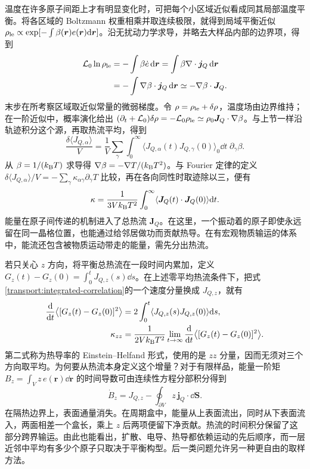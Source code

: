 温度在许多原子间距上才有明显变化时，可把每个小区域近似看成同其局部温度平衡。将各区域的 Boltzmann 权重相乘并取连续极限，就得到局域平衡近似 $\rho_{\rm le}\propto\exp[-\int\beta(\bm r)e(\bm r)\mathrm{d}\bm r]$。沿无扰动力学求导，并略去大样品内部的边界项，得到
\begin{align}
\mathcal L_0\ln\rho_{\rm le}
&=-\int\beta\dot e\,\mathrm{d}\bm r
=\int\beta\nabla\cdot\bm j_Q\,\mathrm{d}\bm r\\
&=-\int\nabla\beta\cdot\bm j_Q\,\mathrm{d}\bm r
\simeq-\nabla\beta\cdot\bm J_Q.
\end{align}
末步在所考察区域取近似常量的微弱梯度。令 $\rho=\rho_{\rm le}+\delta\rho$，温度场由边界维持；在一阶近似中，概率演化给出 $(\partial_t+\mathcal L_0)\delta\rho=-\mathcal L_0\rho_{\rm le}\simeq\rho_0\bm J_Q\cdot\nabla\beta$。与上节一样沿轨迹积分这个源，再取热流平均，得到
\begin{equation}
\frac{\delta\langle J_{Q,\alpha}\rangle}{V}
=\frac1V\sum_\gamma\int_0^\infty
\langle J_{Q,\alpha}(t)J_{Q,\gamma}(0)\rangle_0\dd t\;\partial_\gamma\beta.
\end{equation}
从 $\beta=1/(k_{\mathrm B} T)$ 求导得 $\nabla\beta=-\nabla T/(k_{\mathrm B} T^2)$。与 Fourier 定律的定义 $\delta\langle J_{Q,\alpha}\rangle/V=-\sum_\gamma\kappa_{\alpha\gamma}\partial_\gamma T$ 比较，再在各向同性时取迹除以三，便有
\begin{equation}
\kappa=\frac1{3Vk_{\mathrm B} T^2}\int_0^\infty\langle\bm J_Q(t)\cdot\bm J_Q(0)\rangle\mathrm{d} t.
\end{equation}
能量在原子间传递的机制进入了总热流 $\bm J_Q$。在这里，一个振动着的原子即使永远留在同一晶格位置，也能通过给邻居做功而贡献热导。在有宏观物质输运的体系中，能流还包含被物质运动带走的能量，需先分出热流。

若只关心 $z$ 方向，将平衡总热流在一段时间内累加，定义 $G_z(t)-G_z(0)=\int_0^t J_{Q,z}(s)\dd s$。在上述零平均热流条件下，把式\eqref{transport:integrated-correlation}的一个速度分量换成 $J_{Q,z}$，就有
\begin{align}
 \frac{\mathrm{d}}{\mathrm{d} t}\big\langle[G_z(t)-G_z(0)]^2\big\rangle
 &=2\int_0^t\langle J_{Q,z}(s)J_{Q,z}(0)\rangle\mathrm{d} s,\notag\\
 \kappa_{zz}
 &=\frac{1}{2Vk_{\mathrm B} T^2}\lim_{t\to\infty}
   \frac{\mathrm{d}}{\mathrm{d} t}\big\langle[G_z(t)-G_z(0)]^2\big\rangle .
\end{align}
第二式称为热导率的 Einstein--Helfand 形式，使用的是 $zz$ 分量，因而无须对三个方向取平均。为何要从热流本身定义这个增量？对于有限样品，能量一阶矩 $B_z=\int_V z\,e(\bm r)\dd\bm r$ 的时间导数可由连续性方程分部积分得到
\[
 \dot B_z=J_{Q,z}-\oint_{\partial V}z\,\bm j_Q\cdot\dd\bm S .
\]
在隔热边界上，表面通量消失。在周期盒中，能量从上表面流出，同时从下表面流入，两面相差一个盒长，乘上 $z$ 后两项便留下净贡献。热流的时间积分保留了这部分跨界输运。由此也能看出，扩散、电导、热导都依赖运动的先后顺序，而一层近邻中平均有多少个原子只取决于平衡构型。后一类问题允许另一种更自由的取样方法。
